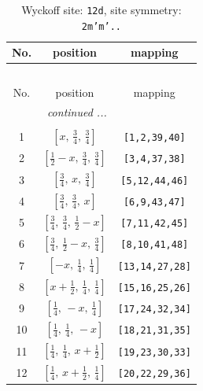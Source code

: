 \documentclass[fleqn,8pt]{jsarticle}
\begin{document}
\begin{longtable}{ccc}
\caption{Wyckoff site: {\tt 12d}, site symmetry: {\tt 2m'm'..}}
 \\
 \hline \hline
No. & position & mapping \\ \hline \endfirsthead

\multicolumn{2}{l}{\tablename\ \thetable{}} \\
 \hline \hline
No. & position & mapping \\ \hline \endhead

 \hline \hline
\multicolumn{2}{r}{\footnotesize\it continued ...} \\ \endfoot

 \hline \hline
\multicolumn{2}{r}{} \\ \endlastfoot

1 & $\left[ x,\, \frac{3}{4},\, \frac{3}{4} \right]$ & {\tt [1,2,39,40]} \\ \hline
2 & $\left[ \frac{1}{2} - x,\, \frac{3}{4},\, \frac{3}{4} \right]$ & {\tt [3,4,37,38]} \\ \hline
3 & $\left[ \frac{3}{4},\, x,\, \frac{3}{4} \right]$ & {\tt [5,12,44,46]} \\ \hline
4 & $\left[ \frac{3}{4},\, \frac{3}{4},\, x \right]$ & {\tt [6,9,43,47]} \\ \hline
5 & $\left[ \frac{3}{4},\, \frac{3}{4},\, \frac{1}{2} - x \right]$ & {\tt [7,11,42,45]} \\ \hline
6 & $\left[ \frac{3}{4},\, \frac{1}{2} - x,\, \frac{3}{4} \right]$ & {\tt [8,10,41,48]} \\ \hline
7 & $\left[ - x,\, \frac{1}{4},\, \frac{1}{4} \right]$ & {\tt [13,14,27,28]} \\ \hline
8 & $\left[ x + \frac{1}{2},\, \frac{1}{4},\, \frac{1}{4} \right]$ & {\tt [15,16,25,26]} \\ \hline
9 & $\left[ \frac{1}{4},\, - x,\, \frac{1}{4} \right]$ & {\tt [17,24,32,34]} \\ \hline
10 & $\left[ \frac{1}{4},\, \frac{1}{4},\, - x \right]$ & {\tt [18,21,31,35]} \\ \hline
11 & $\left[ \frac{1}{4},\, \frac{1}{4},\, x + \frac{1}{2} \right]$ & {\tt [19,23,30,33]} \\ \hline
12 & $\left[ \frac{1}{4},\, x + \frac{1}{2},\, \frac{1}{4} \right]$ & {\tt [20,22,29,36]} \\
\end{longtable}
\renewcommand{\arraystretch}{1.2}
\end{document}

